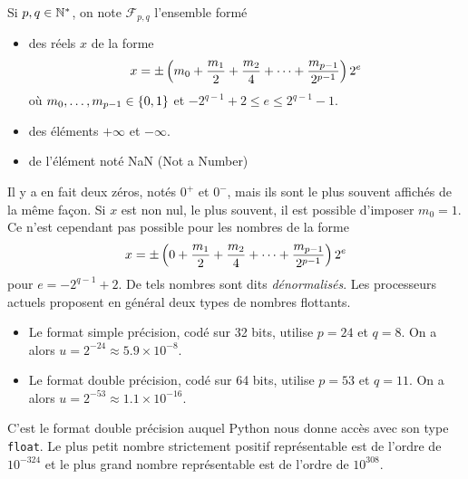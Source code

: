 \documentclass{magnolia}
\begin{document}
\begin{definition}
Si $p,q\in{\mathbb{N}^*}$, on note $\mathcal{F}_{p,q}$ l'ensemble form\'e
\begin{itemize}
\item des réels $x$ de la forme
\[x=\pm\left(m_0+\frac{m_1}{2}+\frac{m_2}{4}+\cdots+\frac{m_{p-1}}{2^{p-1}}\right) 2^e\]
où $m_0,\ldots,m_{p-1}\in\left\{0,1\right\}$ et $-2^{q-1}+2\leq e\leq 2^{q-1}-1$.
\item des éléments $+\infty$ et $-\infty$.
\item de l'élément noté {\sc NaN} (Not a Number)
\end{itemize}
\end{definition}

\begin{remarques}
  \remarque Il y a en fait deux zéros, notés $0^+$ et $0^-$, mais ils sont le plus
  souvent affichés de la même façon.
\remarque Si $x$ est non nul, le plus souvent, il est possible d'imposer $m_0=1$. Ce n'est
  cependant pas possible pour les nombres de la forme
  \[x=\pm\left(0+\frac{m_1}{2}+\frac{m_2}{4}+\cdots+\frac{m_{p-1}}{2^{p-1}}\right) 2^e\]
  pour $e=-2^{q-1}+2$. De tels nombres sont dits \emph{dénormalisés}.
\remarque Les processeurs actuels proposent en général deux types de nombres flottants.
  \begin{itemize}
  \item Le format simple précision, codé sur 32 bits, utilise
  $p=24$ et $q=8$. On a alors $u=2^{-24}\approx 5.9\times 10^{-8}$.
\item Le format double précision, codé sur 64 bits, utilise $p=53$ et $q=11$.
  On a alors $u=2^{-53}\approx 1.1\times10^{-16}$.
  \end{itemize}
 C'est le format double précision auquel Python nous donne accès avec son type \verb_float_.  Le plus petit nombre strictement positif représentable est de l'ordre de $10^{-324}$ et le plus grand nombre représentable est de l'ordre de $10^{308}$.


\end{remarques}
\end{document}
